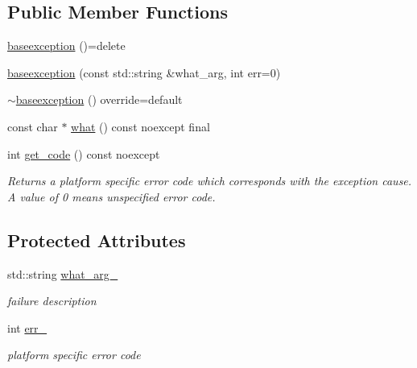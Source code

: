 \subsection*{Public Member Functions}
\begin{DoxyCompactItemize}
\item 
\hyperlink{structdevfix_1_1base_1_1error_1_1baseexception_abc1384f68bf47292ab520a96eedec596}{baseexception} ()=delete
\item 
\hyperlink{structdevfix_1_1base_1_1error_1_1baseexception_ad2b9d2672d0a946cabc16bf26be3fe2e}{baseexception} (const std\+::string \&what\+\_\+arg, int err=0)
\item 
\hyperlink{structdevfix_1_1base_1_1error_1_1baseexception_a3ae67c736d3268683cb92556c9f14bd7}{$\sim$baseexception} () override=default
\item 
const char $\ast$ \hyperlink{structdevfix_1_1base_1_1error_1_1baseexception_a16327152a55d65b1e537825231fbd452}{what} () const noexcept final
\item 
int \hyperlink{structdevfix_1_1base_1_1error_1_1baseexception_ae2333e7e833e2b922fb8aa50c7fa8e79}{get\+\_\+code} () const noexcept
\begin{DoxyCompactList}\small\item\em Returns a platform specific error code which corresponds with the exception cause. A value of \textquotesingle{}0\textquotesingle{} means unspecified error code. \end{DoxyCompactList}\end{DoxyCompactItemize}
\subsection*{Protected Attributes}
\begin{DoxyCompactItemize}
\item 
std\+::string \hyperlink{structdevfix_1_1base_1_1error_1_1baseexception_adec18389f27e1d1dae67f80caa1b617b}{what\+\_\+arg\+\_\+}
\begin{DoxyCompactList}\small\item\em failure description \end{DoxyCompactList}\item 
int \hyperlink{structdevfix_1_1base_1_1error_1_1baseexception_aa1f58eb33d67ccf87465656f20b6d640}{err\+\_\+}
\begin{DoxyCompactList}\small\item\em platform specific error code \end{DoxyCompactList}\end{DoxyCompactItemize}


